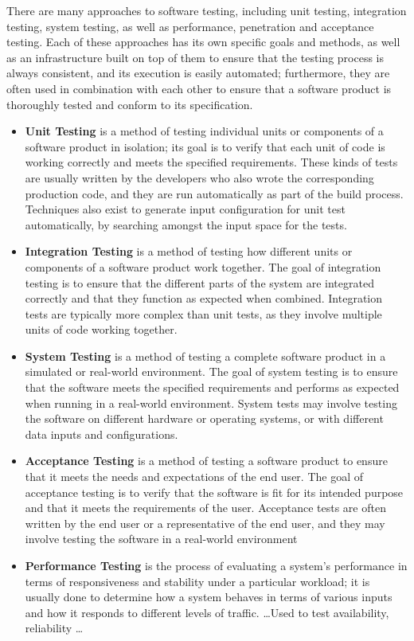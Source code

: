 There are many approaches to software testing, including unit testing, integration testing, system testing, as well as performance, penetration and acceptance testing. Each of these approaches has its own specific goals and methods, as well as an infrastructure built on top of them to ensure that the testing process is always consistent, and its execution is easily automated; furthermore, they are often used in combination with each other to ensure that a software product is thoroughly tested and conform to its specification.
\begin{itemize}
    \item \textbf{Unit Testing} is a method of testing individual units or components of a software product in isolation; its goal is to verify that each unit of code is working correctly and meets the specified requirements. These kinds of tests are usually written by the developers who also wrote the corresponding production code, and they are run automatically as part of the build process. Techniques also exist to generate input configuration for unit test automatically, by searching amongst the input space for the tests.
    \item \textbf{Integration Testing} is a method of testing how different units or components of a software product work together. The goal of integration testing is to ensure that the different parts of the system are integrated correctly and that they function as expected when combined. Integration tests are typically more complex than unit tests, as they involve multiple units of code working together.
    \item \textbf{System Testing} is a method of testing a complete software product in a simulated or real-world environment. The goal of system testing is to ensure that the software meets the specified requirements and performs as expected when running in a real-world environment. System tests may involve testing the software on different hardware or operating systems, or with different data inputs and configurations.
    \item \textbf{Acceptance Testing} is a method of testing a software product to ensure that it meets the needs and expectations of the end user. The goal of acceptance testing is to verify that the software is fit for its intended purpose and that it meets the requirements of the user. Acceptance tests are often written by the end user or a representative of the end user, and they may involve testing the software in a real-world environment
    \item \textbf{Performance Testing} is the process of evaluating a system's performance in terms of responsiveness and stability under a particular workload; it is usually done to determine how a system behaves in terms of various inputs and how it responds to different levels of traffic. \dots Used to test availability, reliability \dots

\end{itemize}
